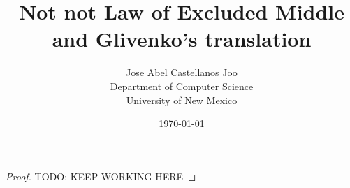 \documentclass{article}
\begin{document}
\title{Not not Law of Excluded Middle and Glivenko's translation}
\author{Jose Abel Castellanos Joo\\Department of Computer Science\\University
of New Mexico\\}

\date{\today}
\maketitle

\begin{proof}
  TODO: KEEP WORKING HERE
\end{proof}

%
%
\end{document}
